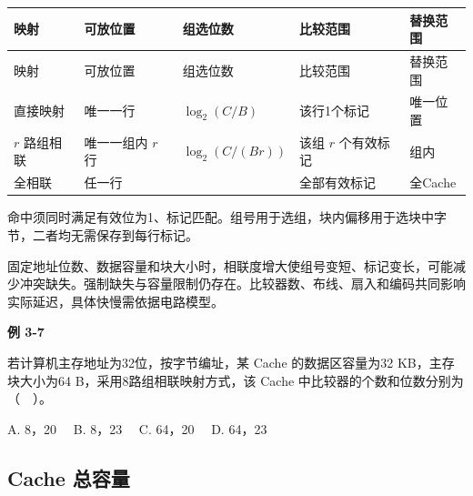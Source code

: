 \par\smallskip
\begin{wideblock}
{\fontsize{9.3}{12}\selectfont\setlength{\tabcolsep}{2.5pt}\setlength{\LTleft}{0pt}\setlength{\LTright}{0pt}
\begin{longtable}{@{}>{\raggedright\arraybackslash}p{}>{\raggedright\arraybackslash}p{}>{\raggedright\arraybackslash}p{}>{\raggedright\arraybackslash}p{}>{\raggedright\arraybackslash}p{}@{}}
\toprule
映射 & 可放位置 & 组选位数 & 比较范围 & 替换范围 \\

\midrule\endfirsthead\toprule
映射 & 可放位置 & 组选位数 & 比较范围 & 替换范围 \\

\midrule\endhead\bottomrule\endfoot
直接映射 & 唯一一行 & \(\log_2(C/B)\) & 该行1个标记 & 唯一位置 \\

\(r\) 路组相联 & 唯一一组内 \(r\) 行 & \(\log_2(C/(Br))\) & 该组 \(r\) 个有效标记 & 组内 \\

全相联 & 任一行 & 0 & 全部有效标记 & 全Cache \\

\end{longtable}}
\end{wideblock}
\par\smallskip

命中须同时满足有效位为1、标记匹配。组号用于选组，块内偏移用于选块中字节，二者均无需保存到每行标记。

固定地址位数、数据容量和块大小时，相联度增大使组号变短、标记变长，可能减少冲突缺失。强制缺失与容量限制仍存在。比较器数、布线、扇入和编码共同影响实际延迟，具体快慢需依据电路模型。

\par\medskip{}\noindent\hypertarget{CO03-E07}{}\label{CO03-E07}\textbf{例 3-7}\par\nobreak\smallskip

若计算机主存地址为32位，按字节编址，某 Cache 的数据区容量为32 KB，主存块大小为64 B，采用8路组相联映射方式，该 Cache 中比较器的个数和位数分别为（　）。

A. 8，20　 B. 8，23　 C. 64，20　 D. 64，23

\subsection{Cache 总容量}\label{CO03-cache-capacity}

